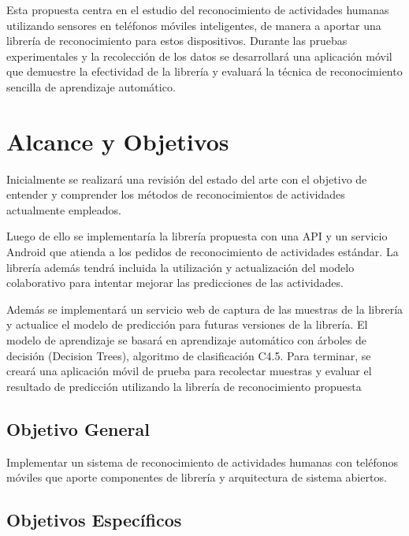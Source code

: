 Esta propuesta centra en el estudio del reconocimiento de actividades
humanas utilizando sensores en teléfonos móviles inteligentes, de
manera a aportar una librería de reconocimiento para estos dispositivos.
Durante las pruebas experimentales y la recolección de los datos se
desarrollará una aplicación móvil que demuestre la efectividad de
la librería y evaluará la técnica de reconocimiento sencilla de aprendizaje
automático.

\section{Alcance y Objetivos}

\label{alcance-y-objetivos}

Inicialmente se realizará una revisión del estado del arte con el
objetivo de entender y comprender los métodos de reconocimientos de
actividades actualmente empleados.

Luego de ello se implementaría la librería propuesta con una API y
un servicio Android que atienda a los pedidos de reconocimiento de
actividades estándar. La librería además tendrá incluida la utilización
y actualización del modelo colaborativo para intentar mejorar las
predicciones de las actividades.

Además se implementará un servicio web de captura de las muestras
de la librería y actualice el modelo de predicción para futuras versiones
de la librería. El modelo de aprendizaje se basará en aprendizaje
automático con árboles de decisión (Decision Trees), algoritmo de
clasificación C4.5. Para terminar, se creará una aplicación móvil
de prueba para recolectar muestras y evaluar el resultado de predicción
utilizando la librería de reconocimiento propuesta

\subsection{Objetivo General}

\label{objetivo-general}

Implementar un sistema de reconocimiento de actividades humanas con
teléfonos móviles que aporte componentes de librería y arquitectura
de sistema abiertos.

\subsection{Objetivos Específicos}

